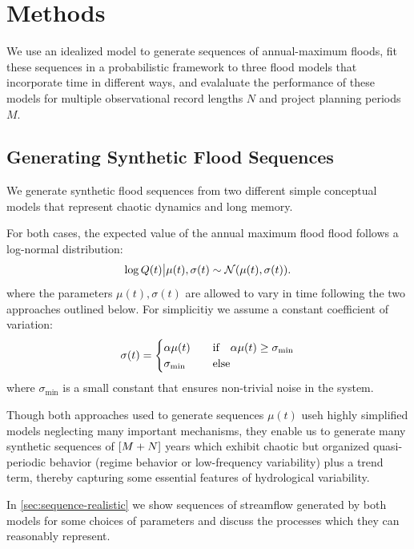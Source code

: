 \documentclass[12pt]{article}
\begin{document}
\section{Methods}\label{sec:methods}

We use an idealized model to generate sequences of annual-maximum floods, fit these sequences in a probabilistic framework to three flood models that incorporate time in different ways, and evalaluate the performance of these models for multiple observational record lengths \(N\) and project planning periods \(M\).

\subsection{Generating Synthetic Flood Sequences}

We generate synthetic flood sequences from two different simple conceptual models that represent chaotic dynamics and long memory.

For both cases, the expected value of the annual maximum flood flood follows a log-normal distribution:
\begin{equation} \label{eq:lognormal}
  \log Q(t) \big| \mu(t),\sigma(t) \sim \mathcal{N} \qty(\mu(t), \sigma(t)).
\end{equation}
where the parameters \( \mu(t), \sigma(t) \) are allowed to vary in time following the two approaches outlined below.
For simplicitiy we assume a constant coefficient of variation:
\begin{equation}
  \sigma(t) = \begin{cases} \alpha \mu(t) & \qqtext{if} \alpha \mu(t) \geq \sigma_\text{min} \\ \sigma_\text{min} & \qqtext{else} \end{cases}
\end{equation}
where \(\sigma_\text{min}\) is a small constant that ensures non-trivial noise in the system.

Though both approaches used to generate sequences \( \mu(t) \) useh highly simplified models neglecting many important mechanisms, they enable us to generate many synthetic sequences of \(\qty[M + N]\) years which exhibit chaotic but organized quasi-periodic behavior (regime behavior or low-frequency variability) plus a trend term, thereby capturing some essential features of hydrological variability.

In \cref{sec:sequence-realistic} we show sequences of streamflow generated by both models for some choices of parameters and discuss the processes which they can reasonably represent.
\end{document}

